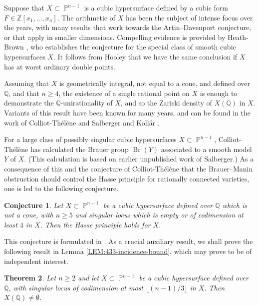\documentclass[a4paper,11pt, twoside,reqno]{amsart}
\theoremstyle{plain}
\newtheorem{thm}{Theorem}[section]
\newtheorem{conjecture}[thm]{Conjecture}
\theoremstyle{definition}
\theoremstyle{remark}
\newcommand{\ZZ}{\mathbb{Z}}
\newcommand{\QQ}{\mathbb{Q}}
\DeclareMathOperator{\Br}{Br}
\DeclareMathOperator{\PP}{\mathbb{P}}
\renewcommand{\ge}{\geqslant}
\renewcommand{\geq}{\geqslant}
\numberwithin{equation}{section}
\begin{document}
Suppose that $X\subset \PP^{n-1}$ is a cubic hypersurface defined by 
a cubic form $F\in \ZZ[x_1,\dots,x_n]$.  The arithmetic of $X$ has been the subject of intense focus over the years, with many results that 
work towards the 
Artin--Davenport conjecture, or that apply in smaller dimensions. 
Compelling evidence is provided by  Heath-Brown \cite{hb10},
who establishes the conjecture for the special class of smooth cubic hypersurfaces $X$. It follows from Hooley \cite{hooley9,hooley9.2, Hoo13} that we have the same conclusion if $X$ has at worst ordinary double points. 

Assuming that $X$ is
geometrically integral, not equal to  a
cone, and defined over $\QQ$,
and that $n\ge 4$,
the existence of a single rational point on $X$ is
enough to demonstrate the $\QQ$-unirationality of $X$, 
and so the Zariski density of $X(\QQ)$ in $X$. 
Variants of this result have been known for many years, and can be found in the work of Colliot-Th\'el\`ene and Salberger
\cite[Proposition 1.3]{c-t-s} and Koll\'ar \cite{kollar}. 


For a large class of possibly singular cubic hypersurfaces $X\subset \PP^{n-1}$, 
Colliot-Th\'el\`ene \cite[Appendix]{Bro10}
 has calculated the Brauer group
$\Br(Y)$ associated to a smooth  model $Y$ of
$X$. (This calculation is based on earlier unpublished work of Salberger.)
As a consequence of this and the conjecture of 
Colliot-Th\'el\`ene \cite{bud} that the Brauer--Manin obstruction should control the Hasse principle for 
rationally connected varieties, one is led to the following conjecture.


\begin{conjecture}
Let $X\subset\PP^{n-1}$ be a cubic
hypersurface defined over $\QQ$ which is not a cone, with $n\geq 5$ and 
singular locus which is empty or of codimension at least $4$ in $X$.
Then the Hasse principle holds for $X$.
\end{conjecture}

This conjecture is formulated in \cite[\S1]{Bro10}.
As a crucial  auxiliary result, we shall prove the following result in
Lemma \ref{LEM:433-incidence-bound}, which may prove to be of independent interest. 

\begin{thm}\label{thm:sing}
Let $n\geq 2$ and let  $X\subset\PP^{n-1}$ be a cubic
hypersurface defined over $\QQ$,  
with  singular locus of 
 codimension at most $\lfloor (n-1)/3 \rfloor$ in $X$.
Then $X(\QQ) \ne \emptyset$.
\end{thm}
\end{document}
